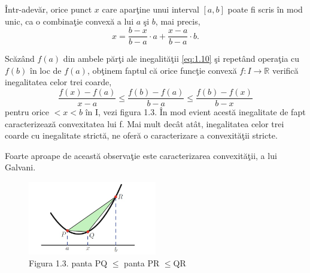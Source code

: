 \documentclass[a4paper,12pt,oneside]{report}
\begin{document}
\^{I}ntr-adev\u{a}r,  orice punct \(x\) care apar\c{t}ine unui interval \(\left [ a,b \right ]\) poate fi scris \^{i}n mod unic, ca o combina\c{t}ie convex\u{a} a lui \(a\) \c{s}i \(b\), mai precis,
\begin{displaymath}
    x = \frac{b - x}{b - a} \cdot a  + \frac{x- a}{b - a}\cdot b.
\end{displaymath}

Sc\u{a}z\^{a}nd \(f\left ( a \right )\) din ambele p\u{a}r\c{t}i ale inegalit\u{a}\c{t}ii \ref{eq:1.10} \c{s}i repet\^{a}nd opera\c{t}ia cu \(f\left ( b \right )\) \^{i}n loc de \(f\left ( a \right )\), ob\c{t}inem faptul c\u{a} orice func\c{t}ie convex\u{a} \(f : I \rightarrow \mathbb{R}\) verific\u{a} inegalitatea celor trei coarde,
\begin{displaymath}
   \frac{f\left ( x \right ) - f\left ( a \right )}{x-a}\leq \frac{f\left ( b \right )- f\left ( a \right )}{b-a}\leq \frac{f\left ( b \right ) - f\left ( x \right )}{b-x} \label{eq:1.12} \tag{1.12}
\end{displaymath}
pentru orice \(< x< b\) \^{i}n I, vezi figura 1.3. \^{I}n mod evient acest\u{a} inegalitate de fapt caracterizeaz\u{a} convexitatea lui f. Mai mult dec\^{a}t at\^{a}t, inegalitatea celor trei coarde cu inegalitate strict\u{a}, ne ofer\u{a} o caracterizare a convexit\u{a}\c{t}ii stricte. 

Foarte aproape de aceast\u{a} observa\c{t}ie este caracterizarea convexit\u{a}\c{t}ii, a lui Galvani.

\begin{figure}[htbp]
	\centering
	\includegraphics[width=0.5\textwidth]{fig1.3.png}
	\caption{Figura 1.3. panta PQ \(\leq\) panta PR \(\leq \)QR}
\end{figure}
\end{document}
